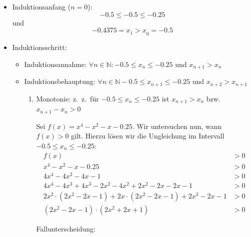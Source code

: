 \documentclass[a4paper, 12pt]{book}
\begin{document}
\begin{itemize}
\item Induktionsanfang (\(n = 0\)):
\[- 0.5 \leq  - 0.5 \leq  - 0.25\]
und
\[{- 0.4375 = x_{1} > x}_{0} =  -0.5\]
\item Induktionsschritt:
\begin{itemize}
\item Induktionsannahme:
\(\forall n \in \mathbb{N}: -0.5\leq x_{n} \leq  - 0.25\)
und \(x_{n + 1} > x_{n}\)
\item Induktionsbehauptung:
\(\forall n \in \mathbb{N} -0.5\leq x_{n + 1} \leq  - 0.25\)
und \(x_{n + 2} > x_{n + 1}\)

\begin{enumerate}
\item  Monotonie:
z.~z.~für \(-0.5\leq x_{n} \leq  -0.25\) ist
\(x_{n + 1} > x_{n}\) bzw. \(x_{n + 1} - {x}_{n} > 0\)

Sei \(f(x) = x^{4} - x^{2} - x - 0.25\).
Wir untersuchen nun, wann \(f(x) > 0\) gilt. Hierzu lösen wir die
Ungleichung im Intervall \(- 0.5\leq x_{n} \leq  - 0.25\):
\begin{align*}
f(x) &> 0\\
x^{4} - x^{2} - x - 0.25 &> 0\\
4x^{4} - 4x^{2} - 4x - 1 &> 0\\
4x^{4} - 4x^{3} + 4x^{3} - 2x^{2} - 4x^{2} + 2x^{2} - 2x - 2x - 1&> 0\\
2x^{2} \cdot (2x^{2} - 2x - 1) + 2x \cdot (2x^{2} - 2x - 1) + 2x^{2} - 2x - 1 &> 0\\
(2x^{2} - 2x - 1) \cdot (2x^{2} + 2x + 1) &> 0
\end{align*}

Fallunterscheidung:


\end{enumerate}
\end{itemize}
\end{itemize}
\end{document}
